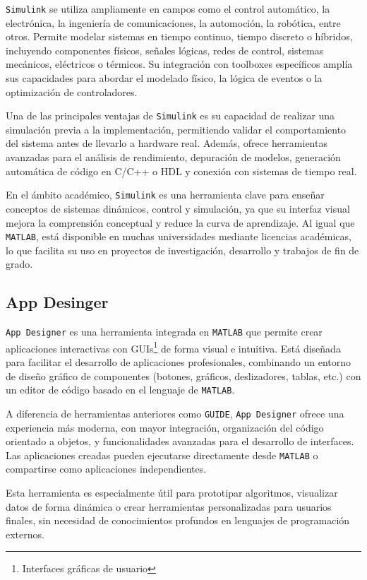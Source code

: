\texttt{Simulink} se utiliza ampliamente en campos como el control automático, la electrónica, la ingeniería de comunicaciones, la automoción, la robótica, entre otros. Permite modelar sistemas en tiempo continuo, tiempo discreto o híbridos, incluyendo componentes físicos, señales lógicas, redes de control, sistemas mecánicos, eléctricos o térmicos. Su integración con toolboxes específicos amplía sus capacidades para abordar el modelado físico, la lógica de eventos o la optimización de controladores.

Una de las principales ventajas de \texttt{Simulink} es su capacidad de realizar una simulación previa a la implementación, permitiendo validar el comportamiento del sistema antes de llevarlo a hardware real. Además, ofrece herramientas avanzadas para el análisis de rendimiento, depuración de modelos, generación automática de código en C/C++ o HDL y conexión con sistemas de tiempo real.

En el ámbito académico, \texttt{Simulink} es una herramienta clave para enseñar conceptos de sistemas dinámicos, control y simulación, ya que su interfaz visual mejora la comprensión conceptual y reduce la curva de aprendizaje. Al igual que \texttt{MATLAB}, está disponible en muchas universidades mediante licencias académicas, lo que facilita su uso en proyectos de investigación, desarrollo y trabajos de fin de grado.

\subsection{App Desinger}
\texttt{App Designer} \cite{mathworks_matlab} es una herramienta integrada en \texttt{MATLAB} que permite crear aplicaciones interactivas con GUIs\footnote{Interfaces gráficas de usuario} de forma visual e intuitiva. Está diseñada para facilitar el desarrollo de aplicaciones profesionales, combinando un entorno de diseño gráfico de componentes (botones, gráficos, deslizadores, tablas, etc.) con un editor de código basado en el lenguaje de \texttt{MATLAB}.

A diferencia de herramientas anteriores como \texttt{GUIDE}, \texttt{App Designer} ofrece una experiencia más moderna, con mayor integración, organización del código orientado a objetos, y funcionalidades avanzadas para el desarrollo de interfaces. Las aplicaciones creadas pueden ejecutarse directamente desde \texttt{MATLAB} o compartirse como aplicaciones independientes.

Esta herramienta es especialmente útil para prototipar algoritmos, visualizar datos de forma dinámica o crear herramientas personalizadas para usuarios finales, sin necesidad de conocimientos profundos en lenguajes de programación externos.

